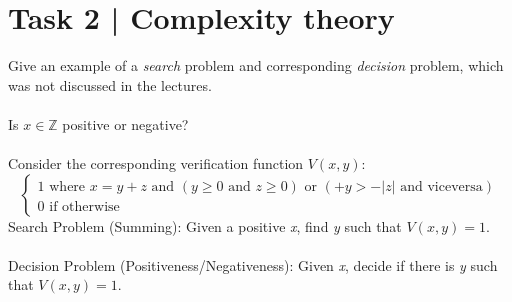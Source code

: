 \documentclass{article}
\begin{document}
\section*{Task 2 | Complexity theory}
Give an example of a \textit{search} problem and corresponding \textit{decision} problem,
which was not discussed in the lectures. \\\\
Is $x \in \mathbb{Z}$ positive or negative? \\\\
Consider the corresponding verification function $V(x,y)$:
$$\begin{cases}
    1 \text{  where } x = y + z \text{ and } (y \ge 0 \text{ and }z \ge 0) \text{ or } (+y > -|z| \text{ and viceversa}) \\
    0 \text{  if otherwise}
\end{cases}$$
Search Problem (Summing): Given a positive \textit{x}, find \textit{y} such that
$V(x,y) = 1$. \\\\
Decision Problem (Positiveness/Negativeness): Given \textit{x}, decide if there is 
\textit{y} such that $V(x,y) = 1$.
\end{document}
